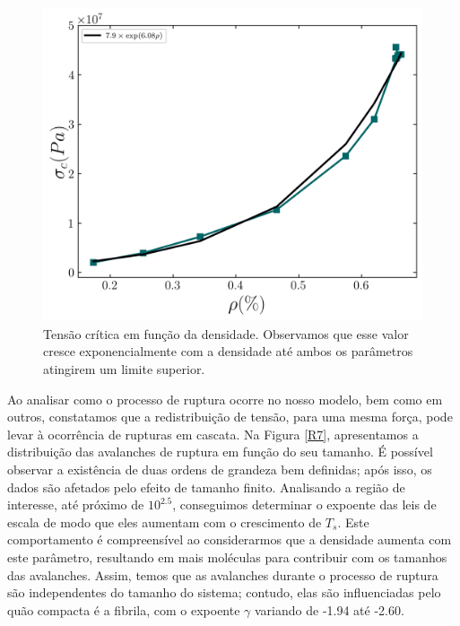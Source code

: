 \documentclass{article}
\begin{document}
    \begin{figure}[H]
        \centering
        \includegraphics[width=\textwidth]{figures/sigma_rho.png}

        \caption{Tensão crítica em função da densidade. Observamos que esse valor cresce exponencialmente com a 
        densidade até ambos os parâmetros atingirem um limite superior.} 


        \label{R6}
    \end{figure}

    Ao analisar como o processo de ruptura ocorre no nosso modelo, bem como em outros, constatamos que a 
    redistribuição de tensão, para uma mesma força, pode levar à ocorrência de rupturas em cascata. Na Figura 
    \ref{R7}, apresentamos a distribuição das avalanches de ruptura em função do seu tamanho. É possível observar a 
    existência de duas ordens de grandeza bem definidas; após isso, os dados são afetados pelo efeito de tamanho 
    finito. Analisando a região de interesse, até próximo de \(10^{2.5}\), conseguimos determinar o expoente das leis 
    de escala de modo que eles aumentam com o crescimento de \(T_{s}\). Este comportamento é compreensível ao 
    considerarmos que a densidade aumenta com este parâmetro, resultando em mais moléculas para contribuir com os 
    tamanhos das avalanches. Assim, temos que as avalanches durante o processo de ruptura são independentes do tamanho 
    do sistema; contudo, elas são influenciadas pelo quão compacta é a fibrila, com o expoente \(\gamma\) variando de 
    -1.94 até -2.60. 
\end{document}
